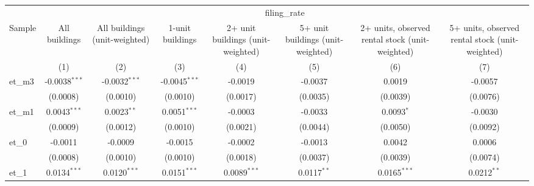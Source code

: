 
\begingroup
\centering
\begin{tabular}{lccccccc}
   \toprule
    & \multicolumn{7}{c}{filing\_rate}\\
   Sample             & All buildings   & All buildings (unit-weighted) & 1-unit buildings & 2+ unit buildings (unit-weighted) & 5+ unit buildings (unit-weighted) & 2+ units, observed rental stock (unit-weighted) & 5+ units, observed rental stock (unit-weighted) \\   
                      & (1)             & (2)                           & (3)              & (4)                               & (5)                               & (6)                                             & (7)\\  
   \midrule 
   et\_m3             & -0.0038$^{***}$ & -0.0032$^{***}$               & -0.0045$^{***}$  & -0.0019                           & -0.0037                           & 0.0019                                          & -0.0057\\   
                      & (0.0008)        & (0.0010)                      & (0.0010)         & (0.0017)                          & (0.0035)                          & (0.0039)                                        & (0.0076)\\   
   et\_m1             & 0.0043$^{***}$  & 0.0023$^{**}$                 & 0.0051$^{***}$   & -0.0003                           & -0.0033                           & 0.0093$^{*}$                                    & -0.0030\\   
                      & (0.0009)        & (0.0012)                      & (0.0010)         & (0.0021)                          & (0.0044)                          & (0.0050)                                        & (0.0092)\\   
   et\_0              & -0.0011         & -0.0009                       & -0.0015          & -0.0002                           & -0.0013                           & 0.0042                                          & 0.0006\\   
                      & (0.0008)        & (0.0010)                      & (0.0010)         & (0.0018)                          & (0.0037)                          & (0.0039)                                        & (0.0074)\\   
   et\_1              & 0.0134$^{***}$  & 0.0120$^{***}$                & 0.0151$^{***}$   & 0.0089$^{***}$                    & 0.0117$^{**}$                     & 0.0165$^{***}$                                  & 0.0212$^{**}$\\   

\end{tabular}
